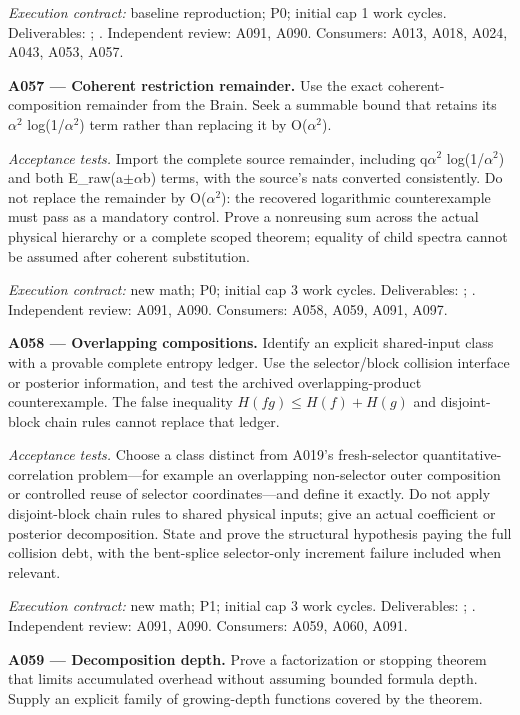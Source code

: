 \documentclass[11pt]{article}
\begin{document}
{\small\emph{Execution contract:} baseline reproduction; P0; initial cap 1 work cycles. Deliverables: ; . Independent review: A091, A090. Consumers: A013, A018, A024, A043, A053, A057.}

\textbf{A057 --- Coherent restriction remainder.} Use the exact coherent-composition remainder from the Brain. Seek a summable bound that retains its $\alpha^2$ log(1/$\alpha^2$) term rather than replacing it by O($\alpha^2$).

\emph{Acceptance tests.} Import the complete source remainder, including q$\alpha$$^2$ log(1/$\alpha$$^2$) and both E\_raw(a$\pm$$\alpha$b) terms, with the source's nats converted consistently. Do not replace the remainder by O($\alpha$$^2$): the recovered logarithmic counterexample must pass as a mandatory control. Prove a nonreusing sum across the actual physical hierarchy or a complete scoped theorem; equality of child spectra cannot be assumed after coherent substitution.

{\small\emph{Execution contract:} new math; P0; initial cap 3 work cycles. Deliverables: ; . Independent review: A091, A090. Consumers: A058, A059, A091, A097.}

\textbf{A058 --- Overlapping compositions.} Identify an explicit shared-input class with a provable complete entropy ledger. Use the selector/block collision interface or posterior information, and test the archived overlapping-product counterexample. The false inequality $H(fg)\le H(f)+H(g)$ and disjoint-block chain rules cannot replace that ledger.

\emph{Acceptance tests.} Choose a class distinct from A019's fresh-selector quantitative-correlation problem---for example an overlapping non-selector outer composition or controlled reuse of selector coordinates---and define it exactly. Do not apply disjoint-block chain rules to shared physical inputs; give an actual coefficient or posterior decomposition. State and prove the structural hypothesis paying the full collision debt, with the bent-splice selector-only increment failure included when relevant.

{\small\emph{Execution contract:} new math; P1; initial cap 3 work cycles. Deliverables: ; . Independent review: A091, A090. Consumers: A059, A060, A091.}

\textbf{A059 --- Decomposition depth.} Prove a factorization or stopping theorem that limits accumulated overhead without assuming bounded formula depth. Supply an explicit family of growing-depth functions covered by the theorem.
\end{document}
